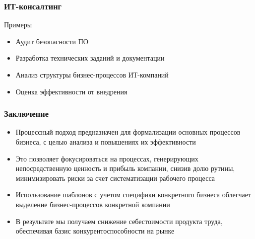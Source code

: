 \documentclass{../industrial-development}
\begin{document}
\begin{frame} \frametitle{ИТ-консалтинг}
	\begin{block}{Примеры}
		\begin{itemize}
			\item Аудит безопасности ПО
			\item Разработка технических заданий и документации
			\item Анализ структуры бизнес-процессов ИТ-компаний
			\item Оценка эффективности от внедрения
		\end{itemize}
	\end{block}
\end{frame}


\begin{frame} \frametitle{Заключение}
	\begin{itemize}
		\item Процессный подход предназначен для формализации основных процессов бизнеса, с целью анализа и повышениях их эффективности
		\item Это позволяет фокусироваться на процессах, генерирующих непосредственную ценность и прибыль компании, снизив долю рутины, минимизировать риски за счет систематизации рабочего процесса
		\item Использование шаблонов с учетом специфики конкретного бизнеса облегчает выделение бизнес-процессов конкретной компании
		\item В результате мы получаем снижение себестоимости продукта труда, обеспечивая базис конкурентоспособности на рынке
	\end{itemize}
\end{frame}
\end{document}
